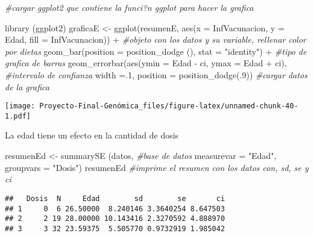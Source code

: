 \documentclass[
]{article}
\newenvironment{Shaded}{\begin{snugshade}}{\end{snugshade}}
\newcommand{\AttributeTok}[1]{\textcolor[rgb]{0.77,0.63,0.00}{#1}}
\newcommand{\CommentTok}[1]{\textcolor[rgb]{0.56,0.35,0.01}{\textit{#1}}}
\newcommand{\DecValTok}[1]{\textcolor[rgb]{0.00,0.00,0.81}{#1}}
\newcommand{\FunctionTok}[1]{\textcolor[rgb]{0.00,0.00,0.00}{#1}}
\newcommand{\NormalTok}[1]{#1}
\newcommand{\OtherTok}[1]{\textcolor[rgb]{0.56,0.35,0.01}{#1}}
\newcommand{\SpecialCharTok}[1]{\textcolor[rgb]{0.00,0.00,0.00}{#1}}
\newcommand{\StringTok}[1]{\textcolor[rgb]{0.31,0.60,0.02}{#1}}
\begin{document}
\begin{Shaded}
\begin{Highlighting}[]
\CommentTok{\#cargar ggplot2 que contiene la funci?n ggplot para hacer la grafica}

\FunctionTok{library}\NormalTok{ (ggplot2) }
\NormalTok{graficaE }\OtherTok{\textless{}{-}} \FunctionTok{ggplot}\NormalTok{(resumenE, }\FunctionTok{aes}\NormalTok{(}\AttributeTok{x =}\NormalTok{ InfVacunacion, }\AttributeTok{y =}\NormalTok{ Edad, }\AttributeTok{fill =}\NormalTok{ InfVacunacion)) }\SpecialCharTok{+} \CommentTok{\#objeto con los datos y su variable, rellenar color por dietas}
    \FunctionTok{geom\_bar}\NormalTok{(}\AttributeTok{position =} \FunctionTok{position\_dodge}\NormalTok{ (), }\AttributeTok{stat =} \StringTok{"identity"}\NormalTok{) }\SpecialCharTok{+} \CommentTok{\#tipo de grafica de barras}
    \FunctionTok{geom\_errorbar}\NormalTok{(}\FunctionTok{aes}\NormalTok{(}\AttributeTok{ymin =}\NormalTok{ Edad }\SpecialCharTok{{-}}\NormalTok{ ci, }\AttributeTok{ymax =}\NormalTok{ Edad }\SpecialCharTok{+}\NormalTok{ ci), }\CommentTok{\#intervalo de confianza}
                  \AttributeTok{width =}\NormalTok{.}\DecValTok{1}\NormalTok{, }
                  \AttributeTok{position =} \FunctionTok{position\_dodge}\NormalTok{(.}\DecValTok{9}\NormalTok{)) }\CommentTok{\#cargar datos de la grafica}
\end{Highlighting}
\end{Shaded}

\texttt{[image: Proyecto-Final-Genómica\_files/figure-latex/unnamed-chunk-40-1.pdf]}

La edad tiene un efecto en la cantidad de dosis

\begin{Shaded}
\begin{Highlighting}[]
\NormalTok{resumenEd }\OtherTok{\textless{}{-}} \FunctionTok{summarySE}\NormalTok{ (datos, }\CommentTok{\#base de datos}
                      \AttributeTok{measurevar =} \StringTok{"Edad"}\NormalTok{, }
                      \AttributeTok{groupvars =} \StringTok{"Dosis"}\NormalTok{) }
\NormalTok{resumenEd }\CommentTok{\#imprime el resumen con los datos con, sd, se y ci}
\end{Highlighting}
\end{Shaded}

\begin{verbatim}
##   Dosis  N     Edad        sd        se       ci
## 1     0  6 26.50000  8.240146 3.3640254 8.647503
## 2     2 19 28.00000 10.143416 2.3270592 4.888970
## 3     3 32 23.59375  5.505770 0.9732919 1.985042
\end{verbatim}
\end{document}
